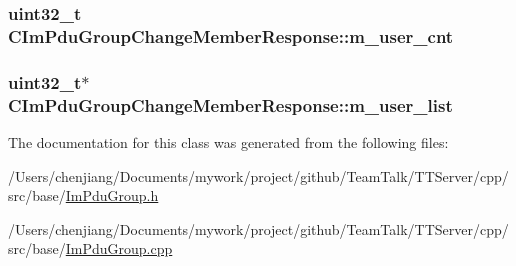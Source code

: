 \subsubsection[{m\+\_\+user\+\_\+cnt}]{\setlength{\rightskip}{0pt plus 5cm}uint32\+\_\+t C\+Im\+Pdu\+Group\+Change\+Member\+Response\+::m\+\_\+user\+\_\+cnt\hspace{0.3cm}{\ttfamily [private]}}\label{class_c_im_pdu_group_change_member_response_aa53443233f375f19caacbdfcb7ce25a7}
\hypertarget{class_c_im_pdu_group_change_member_response_aa3b0ba1a17042420b9cf3549df3c97e2}{}
\subsubsection[{m\+\_\+user\+\_\+list}]{\setlength{\rightskip}{0pt plus 5cm}uint32\+\_\+t$\ast$ C\+Im\+Pdu\+Group\+Change\+Member\+Response\+::m\+\_\+user\+\_\+list\hspace{0.3cm}{\ttfamily [private]}}\label{class_c_im_pdu_group_change_member_response_aa3b0ba1a17042420b9cf3549df3c97e2}


The documentation for this class was generated from the following files\+:\begin{DoxyCompactItemize}
\item 
/\+Users/chenjiang/\+Documents/mywork/project/github/\+Team\+Talk/\+T\+T\+Server/cpp/src/base/\hyperlink{_im_pdu_group_8h}{Im\+Pdu\+Group.\+h}\item 
/\+Users/chenjiang/\+Documents/mywork/project/github/\+Team\+Talk/\+T\+T\+Server/cpp/src/base/\hyperlink{_im_pdu_group_8cpp}{Im\+Pdu\+Group.\+cpp}\end{DoxyCompactItemize}
